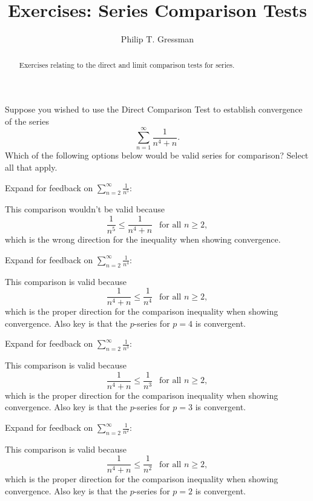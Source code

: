 \documentclass{ximera}
\title{Exercises: Series Comparison Tests}
\author{Philip T. Gressman}
\begin{document}
\begin{abstract}
Exercises relating to the direct and limit comparison tests for series.
\end{abstract}
\maketitle

\begin{exercise}
Suppose you wished to use the Direct Comparison Test to establish convergence of the series
\[ \sum_{n=1}^\infty \frac{1}{n^4 + n}. \]
Which of the following options below would be valid series for comparison? Select all that apply.
\begin{selectAll}
\end{selectAll}
\begin{feedback}
Expand for feedback on {$\displaystyle \sum_{n=2}^\infty \frac{1}{n^5}$}:
\begin{expandable}
This comparison wouldn't be valid because
\[ \frac{1}{n^5} \leq \frac{1}{n^4+n} \ \ \text{ for all } n \geq 2,\]
which is the wrong direction for the inequality when showing convergence.
\end{expandable}

Expand for feedback on {$\displaystyle \sum_{n=2}^\infty \frac{1}{n^4}$}:
\begin{expandable}
This comparison is valid because
\[ \frac{1}{n^4+n} \leq \frac{1}{n^4}  \ \ \text{ for all } n \geq 2,\]
which is the proper direction for the comparison inequality when showing convergence. Also key is that the $p$-series for $p=4$ is convergent.
\end{expandable}

Expand for feedback on {$\displaystyle \sum_{n=2}^\infty \frac{1}{n^3}$}:
\begin{expandable}
This comparison is valid because
\[ \frac{1}{n^4+n} \leq \frac{1}{n^3}  \ \ \text{ for all } n \geq 2, \]
which is the proper direction for the comparison inequality when showing convergence. Also key is that the $p$-series for $p=3$ is convergent.
\end{expandable}

Expand for feedback on {$\displaystyle \sum_{n=2}^\infty \frac{1}{n^2}$}:
\begin{expandable}
This comparison is valid because
\[ \frac{1}{n^4+n} \leq \frac{1}{n^2}  \ \ \text{ for all } n \geq 2, \]
which is the proper direction for the comparison inequality when showing convergence. Also key is that the $p$-series for $p=2$ is convergent.
\end{expandable}


\end{feedback}
\end{exercise}
\end{document}
